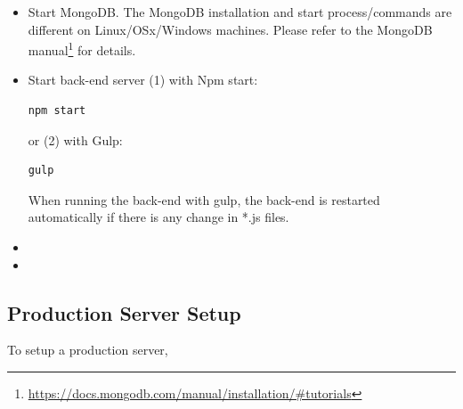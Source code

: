 \begin{itemize}
\item Start MongoDB. The MongoDB installation and start process/commands are different on Linux/OSx/Windows machines. Please refer to the MongoDB manual\footnote{\url{https://docs.mongodb.com/manual/installation/\#tutorials}} for details.  

\item Start back-end server (1) with Npm start: 
\begin{lstlisting}
npm start
\end{lstlisting}
or (2) with Gulp: 
\begin{lstlisting}
gulp
\end{lstlisting}
When running the back-end with gulp, the back-end is restarted automatically if there is any change in *.js files. 

\item

\item 

\end{itemize} 


\subsection{Production Server Setup}

To setup a production server, 